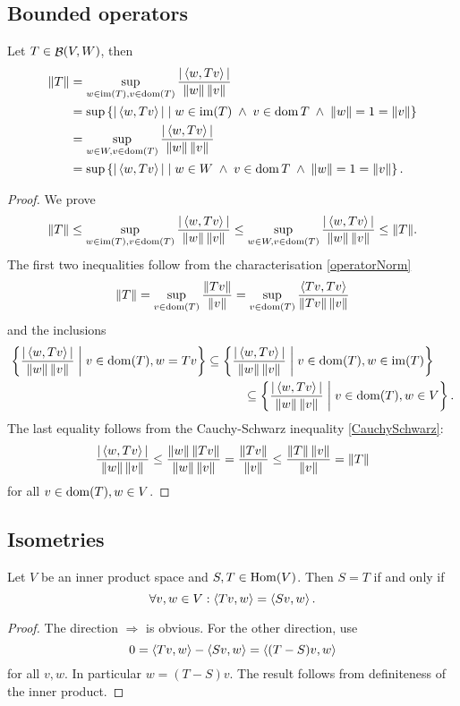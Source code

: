 \subsection{Bounded operators}
\begin{lemma} \label{operatorNormInnerProduct}
Let $T\in\mathop{\mathcal{B}}(V,W)$, then
\begin{align*}
\lVert T\rVert &= \sup_{w\in \operatorname{im}(T),v \in \operatorname{dom}(T)} \frac{|\left\langle w,Tv \right\rangle|}{\lVert w\rVert\,\lVert v\rVert} \\
&= \sup\left\{ |\left\langle w,Tv \right\rangle| \;\middle|\; w\in \operatorname{im}(T)\;\land\; v\in\operatorname{dom}{T}\;\land\; \lVert w\rVert = 1 = \lVert v\rVert \right\} \\
&= \sup_{w\in W,v \in \operatorname{dom}(T)} \frac{|\left\langle w,Tv \right\rangle|}{\lVert w\rVert\,\lVert v\rVert} \\
&= \sup\left\{ |\left\langle w,Tv \right\rangle| \;\middle|\; w\in W\;\land\; v\in\operatorname{dom}{T}\;\land\; \lVert w\rVert = 1 = \lVert v\rVert \right\}.
\end{align*}
\end{lemma}
\begin{proof}
We prove
\[ \lVert T\rVert \leq \sup_{w\in \operatorname{im}(T),v \in \operatorname{dom}(T)} \frac{|\left\langle w,Tv \right\rangle|}{\lVert w\rVert\,\lVert v\rVert} \leq \sup_{w\in W,v \in \operatorname{dom}(T)} \frac{|\left\langle w,Tv \right\rangle|}{\lVert w\rVert\,\lVert v\rVert} \leq \lVert T\rVert. \]
The first two inequalities follow from the characterisation \ref{operatorNorm}
\[ \lVert T\rVert = \sup_{v \in \operatorname{dom}(T)} \frac{\lVert Tv\rVert}{\lVert v\rVert} = \sup_{v \in \operatorname{dom}(T)} \frac{\left\langle Tv,Tv \right\rangle}{\lVert Tv\rVert\,\lVert v\rVert} \]
and the inclusions
\begin{align*}
\left\{ \frac{|\left\langle w,Tv \right\rangle|}{\lVert w\rVert\,\lVert v\rVert} \;\middle|\; v\in\operatorname{dom}(T), w = Tv \right\} &\subseteq \left\{ \frac{|\left\langle w,Tv \right\rangle|}{\lVert w\rVert\,\lVert v\rVert} \;\middle|\; v\in\operatorname{dom}(T), w\in\operatorname{im}(T) \right\}\\
&\qquad\quad\subseteq \left\{ \frac{|\left\langle w,Tv \right\rangle|}{\lVert w\rVert\,\lVert v\rVert} \;\middle|\; v\in\operatorname{dom}(T), w\in V \right\}.
\end{align*}
The last equality follows from the Cauchy-Schwarz inequality \ref{CauchySchwarz}:
\[ \frac{|\left\langle w,Tv \right\rangle|}{\lVert w\rVert\,\lVert v\rVert} \leq \frac{\lVert w\rVert\,\lVert Tv\rVert}{\lVert w\rVert\,\lVert v\rVert} = \frac{\lVert Tv\rVert}{\lVert v\rVert} \leq \frac{\lVert T\rVert\,\lVert v\rVert}{\lVert v\rVert} = \lVert T\rVert \]
for all $v\in\operatorname{dom}(T), w\in V$. 
\end{proof}

\subsection{Isometries}
\begin{lemma} \label{equalityOfMapsInnerProductSpaces}
Let $V$ be an inner product space and $S,T\in\operatorname{Hom}(V)$. Then $S=T$ \textup{if and only if}
\[ \forall v,w\in V: \left\langle Tv,w \right\rangle = \left\langle Sv,w \right\rangle. \]
\end{lemma}
\begin{proof}
The direction $\boxed{\Rightarrow}$ is obvious. For the other direction, use
\[ 0 = \left\langle Tv,w \right\rangle - \left\langle Sv,w \right\rangle = \left\langle (T-S)v,w \right\rangle \]
for all $v,w$. In particular $w=(T-S)v$. The result follows from definiteness of the inner product.
\end{proof}

